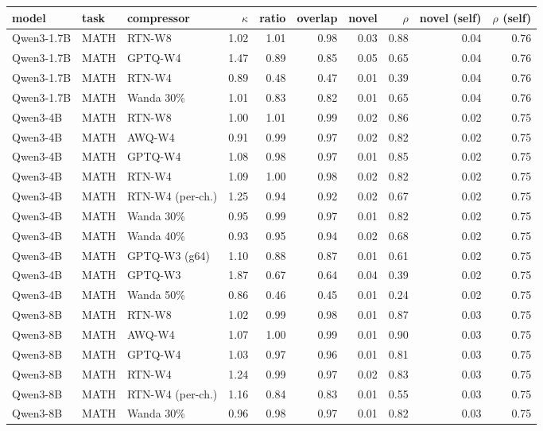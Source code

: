 \begin{tabular}{lllrrrrrrr}
\toprule
model & task & compressor & $\kappa$ & ratio & overlap & novel & $\rho$ & novel (self) & $\rho$ (self) \\
\midrule
Qwen3-1.7B & MATH & RTN-W8 & 1.02 & 1.01 & 0.98 & 0.03 & 0.88 & 0.04 & 0.76 \\
Qwen3-1.7B & MATH & GPTQ-W4 & 1.47 & 0.89 & 0.85 & 0.05 & 0.65 & 0.04 & 0.76 \\
Qwen3-1.7B & MATH & RTN-W4 & 0.89 & 0.48 & 0.47 & 0.01 & 0.39 & 0.04 & 0.76 \\
Qwen3-1.7B & MATH & Wanda 30\% & 1.01 & 0.83 & 0.82 & 0.01 & 0.65 & 0.04 & 0.76 \\
Qwen3-4B & MATH & RTN-W8 & 1.00 & 1.01 & 0.99 & 0.02 & 0.86 & 0.02 & 0.75 \\
Qwen3-4B & MATH & AWQ-W4 & 0.91 & 0.99 & 0.97 & 0.02 & 0.82 & 0.02 & 0.75 \\
Qwen3-4B & MATH & GPTQ-W4 & 1.08 & 0.98 & 0.97 & 0.01 & 0.85 & 0.02 & 0.75 \\
Qwen3-4B & MATH & RTN-W4 & 1.09 & 1.00 & 0.98 & 0.02 & 0.82 & 0.02 & 0.75 \\
Qwen3-4B & MATH & RTN-W4 (per-ch.) & 1.25 & 0.94 & 0.92 & 0.02 & 0.67 & 0.02 & 0.75 \\
Qwen3-4B & MATH & Wanda 30\% & 0.95 & 0.99 & 0.97 & 0.01 & 0.82 & 0.02 & 0.75 \\
Qwen3-4B & MATH & Wanda 40\% & 0.93 & 0.95 & 0.94 & 0.02 & 0.68 & 0.02 & 0.75 \\
Qwen3-4B & MATH & GPTQ-W3 (g64) & 1.10 & 0.88 & 0.87 & 0.01 & 0.61 & 0.02 & 0.75 \\
Qwen3-4B & MATH & GPTQ-W3 & 1.87 & 0.67 & 0.64 & 0.04 & 0.39 & 0.02 & 0.75 \\
Qwen3-4B & MATH & Wanda 50\% & 0.86 & 0.46 & 0.45 & 0.01 & 0.24 & 0.02 & 0.75 \\
Qwen3-8B & MATH & RTN-W8 & 1.02 & 0.99 & 0.98 & 0.01 & 0.87 & 0.03 & 0.75 \\
Qwen3-8B & MATH & AWQ-W4 & 1.07 & 1.00 & 0.99 & 0.01 & 0.90 & 0.03 & 0.75 \\
Qwen3-8B & MATH & GPTQ-W4 & 1.03 & 0.97 & 0.96 & 0.01 & 0.81 & 0.03 & 0.75 \\
Qwen3-8B & MATH & RTN-W4 & 1.24 & 0.99 & 0.97 & 0.02 & 0.83 & 0.03 & 0.75 \\
Qwen3-8B & MATH & RTN-W4 (per-ch.) & 1.16 & 0.84 & 0.83 & 0.01 & 0.55 & 0.03 & 0.75 \\
Qwen3-8B & MATH & Wanda 30\% & 0.96 & 0.98 & 0.97 & 0.01 & 0.82 & 0.03 & 0.75 \\

\end{tabular}
